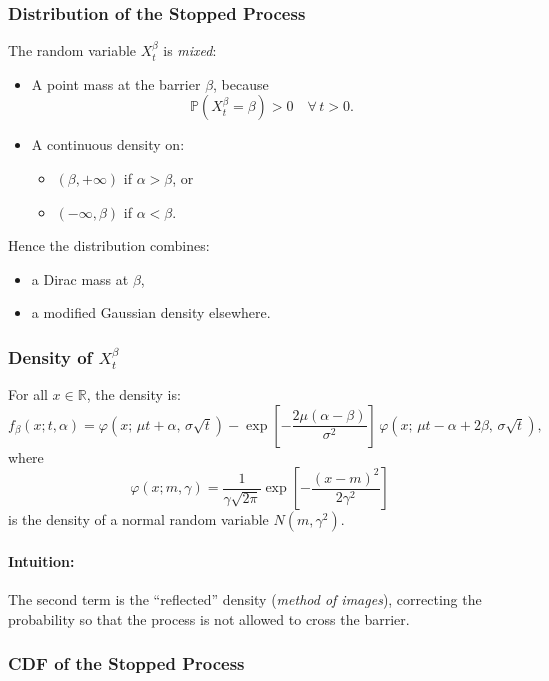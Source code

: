 \documentclass[12pt,a4paper]{article}
\theoremstyle{definition}
\begin{document}
\subsubsection{Distribution of the Stopped Process}

The random variable $X_t^\beta$ is \emph{mixed}:
\begin{itemize}
\item A point mass at the barrier $\beta$, because
\[
\mathbb{P}(X_t^\beta = \beta) > 0 \quad \forall\, t > 0.
\]
\item A continuous density on:
\begin{itemize}
\item $(\beta, +\infty)$ if $\alpha > \beta$, or
\item $(-\infty, \beta)$ if $\alpha < \beta$.
\end{itemize}
\end{itemize}

Hence the distribution combines:
\begin{itemize}
\item a Dirac mass at $\beta$,
\item a modified Gaussian density elsewhere.
\end{itemize}

\subsubsection{Density of $X_t^\beta$}

For all $x \in \mathbb{R}$, the density is:
\[
f_\beta(x; t, \alpha) = \varphi(x;\, \mu t + \alpha,\, \sigma\sqrt{t}) - \exp\!\left[-\frac{2\mu(\alpha - \beta)}{\sigma^2}\right]\, \varphi(x;\, \mu t - \alpha + 2\beta,\, \sigma\sqrt{t}),
\]
where
\[
\varphi(x; m, \gamma) = \frac{1}{\gamma\sqrt{2\pi}} \exp\!\left[-\frac{(x - m)^2}{2\gamma^2}\right]
\]
is the density of a normal random variable $N(m, \gamma^2)$.

\paragraph{Intuition:}

The second term is the ``reflected'' density (\emph{method of images}), correcting the probability so that the process is not allowed to cross the barrier.

\subsubsection{CDF of the Stopped Process}
\end{document}
